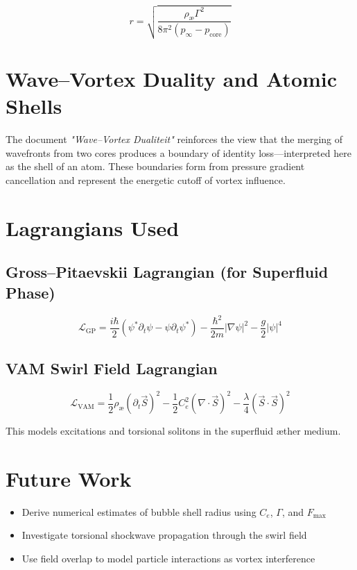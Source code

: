 \documentclass[12pt]{article}
\begin{document}
\[
r = \sqrt{ \frac{\rho_\text{\ae} \Gamma^2}{8\pi^2 (p_\infty - p_\text{core})} }
\]

\section{Wave–Vortex Duality and Atomic Shells}
The document \textit{"Wave–Vortex Dualiteit"} reinforces the view that the merging of wavefronts from two cores produces a boundary of identity loss—interpreted here as the shell of an atom. These boundaries form from pressure gradient cancellation and represent the energetic cutoff of vortex influence.

\section{Lagrangians Used}

\subsection{Gross–Pitaevskii Lagrangian (for Superfluid Phase)}
\[
\mathcal{L}_\text{GP} = \frac{i\hbar}{2} \left( \psi^* \partial_t \psi - \psi \partial_t \psi^* \right)
- \frac{\hbar^2}{2m} |\nabla \psi|^2 - \frac{g}{2} |\psi|^4
\]

\subsection{VAM Swirl Field Lagrangian}
\[
\mathcal{L}_\text{VAM} = \frac{1}{2} \rho_\text{\ae} \left( \partial_t \vec{S} \right)^2
- \frac{1}{2} C_e^2 \left( \nabla \cdot \vec{S} \right)^2
- \frac{\lambda}{4} (\vec{S} \cdot \vec{S})^2
\]

This models excitations and torsional solitons in the superfluid \ae ther medium.

\section{Future Work}
\begin{itemize}
\item Derive numerical estimates of bubble shell radius using \( C_e \), \( \Gamma \), and \( F_{\text{max}} \)
\item Investigate torsional shockwave propagation through the swirl field
\item Use field overlap to model particle interactions as vortex interference
\end{itemize}
\end{document}
